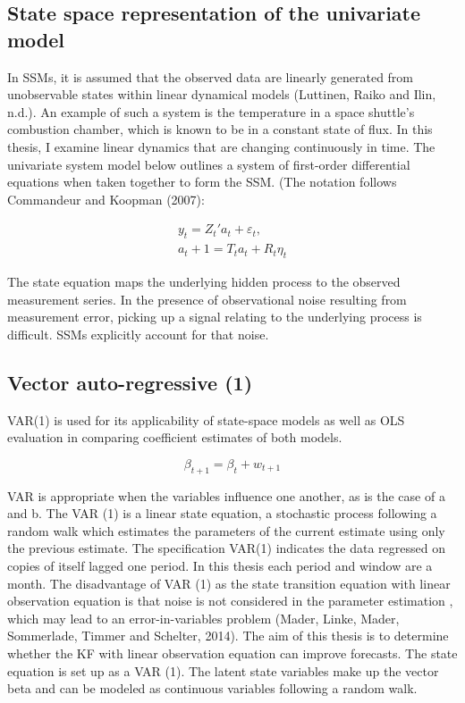 \documentclass[12pt, letterpaper]{article}
\begin{document}
		\subsection{State space representation of the univariate model}
	In SSMs, it is assumed that the observed data are linearly generated from unobservable states within linear dynamical models (Luttinen, Raiko and Ilin, n.d.). An example of such a system is the temperature in a space shuttle’s combustion chamber, which is known to be in a constant state of flux. In this thesis, I examine linear dynamics that are changing continuously in time.
	The univariate system model below outlines a system of first-order differential equations when taken together to form the SSM.
	(The notation follows Commandeur and Koopman (2007):
	
	\begin{gather*} 
		y_t = Z_t'a_t + \varepsilon_t, \\ 
		a_t+1= T_ta_t + R_t\eta_t
	\end{gather*}
	
	
	The state equation maps the underlying hidden process to the observed measurement series. In the presence of observational noise resulting from measurement error, picking up a signal relating to the underlying process is difficult. SSMs explicitly account for that noise.

	\subsection{Vector auto-regressive (1)}
VAR(1) is used for its applicability of state-space models as well as OLS evaluation in comparing coefficient estimates of both models.
	
	\[ \beta_{t+1} =\beta_t + w_{t+1} \]
	
VAR is appropriate when the variables influence one another, as is the case of a and b. The VAR (1) is a linear state equation, a stochastic process following a random walk which estimates the parameters of the current estimate using only the previous estimate. The specification VAR(1) indicates the data regressed on copies of itself lagged one period. In this thesis each period and window are a month.
The disadvantage of  VAR (1) as the state transition equation with linear observation equation is that noise is not considered in the parameter estimation , which may lead to an error-in-variables problem (Mader, Linke, Mader, Sommerlade, Timmer and Schelter, 2014). The aim of this thesis is to determine whether the KF with linear observation equation can improve forecasts. The state equation is set up as a VAR (1). The latent state variables  make up the vector beta and can be modeled as continuous variables following a random walk. 
	
\end{document}
